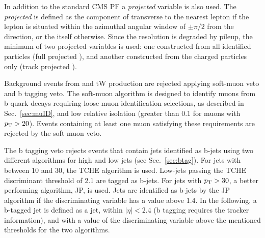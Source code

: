 In addition to the standard CMS PF \MET a \textit{projected} \MET variable is also used. The \textit{projected} \MET is defined as the component of \ptmiss transverse to the nearest lepton if the lepton is situated within the azimuthal angular window of $\pm \pi/2$ from the \ptmiss direction, or the \MET itself otherwise.
Since the \MET resolution is degraded by pileup, the minimum of two projected \MET variables is used: one constructed from all identified particles (full projected \MET), and another constructed from the charged particles only (track projected \MET).

Background events from \ttbar and tW production are rejected applying soft-muon veto and b tagging veto. The soft-muon algorithm is designed to identify muons from b quark decays requiring loose muon identification selections, as described in Sec.~\ref{sec:muID}, and low relative isolation (greater than 0.1 for muons with $p_\mathrm{T}>20$\GeV). Events containing at least one muon satisfying these requirements are rejected by the soft-muon veto.

The b tagging veto rejects events that contain jets identified as b-jets using two different algorithms for high and low \pt jets (see Sec.~\ref{sec:btag}). For jets with \pt between 10 and 30\GeV, the TCHE algorithm is used. Low-\pt jets passing the TCHE discriminant threshold of 2.1 are tagged as b-jets.
For jets with $p_\mathrm{T}>30$\GeV, a better performing algorithm, JP, is used. Jets are identified as b-jets by the JP algorithm if the discriminating variable has a value above 1.4.
In the following, a b-tagged jet is defined as a jet, within $|\eta|<2.4$ (b tagging requires the tracker information), and with a value of the discriminating variable above the mentioned thresholds for the two algorithms.

